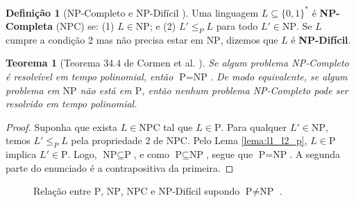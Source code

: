 \documentclass[conference]{IEEEtran}
\theoremstyle{definition}
\newtheorem{definicao}{Definição}
\theoremstyle{plain}
\newtheorem{teorema}{Teorema}
\begin{document}
\begin{definicao}[$\text{NP-Completo}$ e $\text{NP-Difícil}$ \cite{cormen2012algoritmos}]
Uma linguagem $L \subseteq \{0,1\}^*$ é \textbf{NP-Completa} ($\text{NPC}$) se: (1) $L \in \text{NP}$; e (2) $L' \le_P L$ para todo $L' \in \text{NP}$. Se $L$ cumpre a condição 2 mas não precisa estar em $\text{NP}$, dizemos que $L$ é \textbf{NP-Difícil}.
\end{definicao}

\begin{teorema}[Teorema 34.4 de Cormen et al. \cite{cormen2012algoritmos}]
\label{teo:p_igual_np}
Se algum problema NP-Completo é resolvível em tempo polinomial, então $\text{P} = \text{NP}$. De modo equivalente, se algum problema em $\text{NP}$ não está em $\text{P}$, então nenhum problema NP-Completo pode ser resolvido em tempo polinomial.
\end{teorema}

\begin{proof}
Suponha que exista $L \in \text{NPC}$ tal que $L \in \text{P}$. Para qualquer $L' \in \text{NP}$, temos $L' \le_P L$ pela propriedade 2 de $\text{NPC}$. Pelo Lema \ref{lema:l1_l2_p}, $L \in \text{P}$ implica $L' \in \text{P}$. Logo, $\text{NP} \subseteq \text{P}$, e como $\text{P} \subseteq \text{NP}$, segue que $\text{P} = \text{NP}$. A segunda parte do enunciado é a contrapositiva da primeira.
\end{proof}

\begin{figure}[htbp]
\centering
{}
\caption{Relação entre $\text{P}$, $\text{NP}$, $\text{NPC}$ e $\text{NP-Difícil}$ supondo $\text{P} \neq \text{NP}$ \cite{cormen2012algoritmos}.}
\label{fig:classes_diagrama}
\end{figure}
\end{document}
